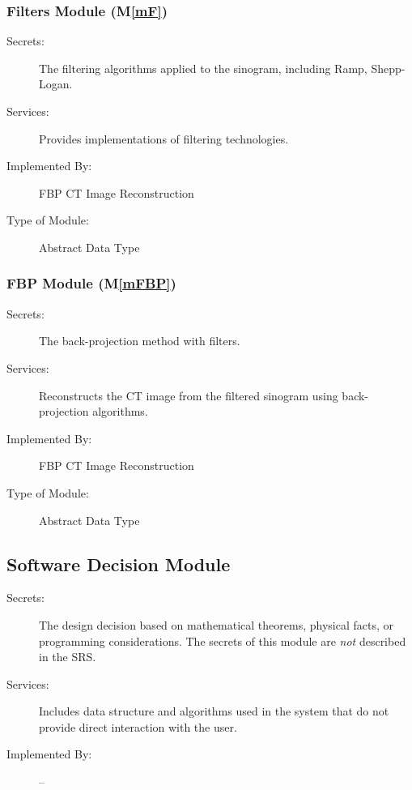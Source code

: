 \documentclass[12pt, titlepage]{article}
\newcommand{\mref}[1]{M\ref{#1}}
\begin{document}
\subsubsection{Filters Module (\mref{mF})}

\begin{description}
\item[Secrets:] The filtering algorithms applied to the sinogram, including Ramp,
  Shepp-Logan.
\item[Services:] Provides implementations of filtering technologies.
\item[Implemented By:] FBP CT Image Reconstruction
\item[Type of Module:] Abstract Data Type
\end{description}

\subsubsection{FBP Module (\mref{mFBP})}

\begin{description}
\item[Secrets:] The back-projection method with filters.
\item[Services:] Reconstructs the CT image from the filtered sinogram using
  back-projection algorithms.
\item[Implemented By:] FBP CT Image Reconstruction
\item[Type of Module:] Abstract Data Type
\end{description}


\subsection{Software Decision Module}

\begin{description}
\item[Secrets:] The design decision based on mathematical theorems, physical
  facts, or programming considerations. The secrets of this module are
  \emph{not} described in the SRS.
\item[Services:] Includes data structure and algorithms used in the system that
  do not provide direct interaction with the user.
\item[Implemented By:] --
\end{description}
\end{document}
